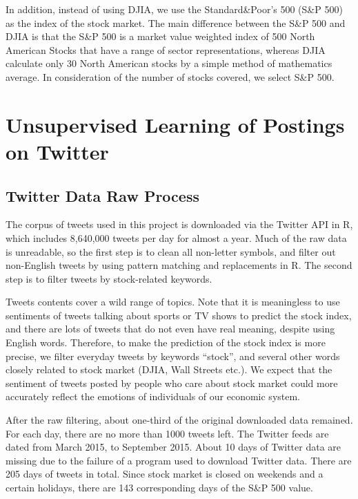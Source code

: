 \documentclass[10pt,letterpaper]{article}
\begin{document}
In addition, instead of using DJIA, we use the Standard\&Poor's 500 (S\&P 500) as the index of the stock market. The main difference between the S\&P 500 and DJIA is that the S\&P 500 is a market value weighted index of 500 North American Stocks that have a range of sector representations, whereas DJIA calculate only 30 North American stocks by a simple method of mathematics average. In consideration of the number of stocks covered, we select S\&P 500. 



\section{Unsupervised Learning of Postings on Twitter}
\subsection{Twitter Data Raw Process}
The corpus of tweets used in this project is downloaded via the Twitter API in R, which includes 8,640,000 tweets per day for almost a year. Much of the raw data is unreadable, so the first step is to clean all non-letter symbols, and filter out non-English tweets by using pattern matching and replacements in R. The second step is to filter tweets by stock-related keywords. 

Tweets contents cover a wild range of topics. Note that it is meaningless to use sentiments of tweets talking about sports or TV shows to predict the stock index, and there are lots of tweets that do not even have real meaning, despite using English words. Therefore, to make the prediction of the stock index is more precise, we filter everyday tweets by keywords ``stock'', and several other words closely related to stock market (DJIA, Wall Streets etc.). We expect that the sentiment of tweets posted by people who care about stock market could more accurately reflect the emotions of individuals of our economic system. 


After the raw filtering, about one-third of the original downloaded data remained. For each day, there are no more than 1000 tweets left. The Twitter feeds are dated from March 2015, to September 2015. About 10 days of Twitter data are missing due to the failure of a program used to download Twitter data. There are 205 days of tweets in total. Since stock market is closed on weekends and a certain holidays, there are 143 corresponding days of the S\&P 500 value.   
\end{document}
